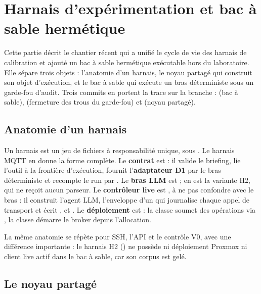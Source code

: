 \section{Harnais d'expérimentation et bac à sable hermétique}\label{sec:harnais-sandbox}

Cette partie décrit le chantier récent qui a unifié le cycle de vie des harnais
de calibration et ajouté un bac à sable hermétique exécutable hors du
laboratoire. Elle sépare trois objets : l'anatomie d'un harnais, le noyau
partagé qui construit son objet d'exécution, et le bac à sable qui exécute un
bras déterministe sous un garde-fou d'audit. Trois commits en portent la trace
sur la branche  :  (bac à sable), 
(fermeture des trous du garde-fou) et  (noyau partagé).

\subsection{Anatomie d'un harnais}

Un harnais est un jeu de fichiers à responsabilité unique, sous
. Le harnais MQTT en donne la forme complète. Le
\textbf{contrat} est  : il valide le briefing, lie
l'outil à la frontière d'exécution, fournit l'\textbf{adaptateur D1} par le bras
déterministe  et recompte le run par . Le
\textbf{bras LLM} est  ;
 en est la variante H2, qui ne reçoit aucun parseur.
Le \textbf{contrôleur live} est , à ne pas
confondre avec le bras : il construit l'agent LLM, l'enveloppe d'un
 qui journalise chaque appel de transport et écrit
,  et . Le
\textbf{déploiement} est  : la classe
 soumet des opérations via , la classe
 démarre le broker depuis l'allocation.

La même anatomie se répète pour SSH, l'API et le contrôle V0, avec une
différence importante : le harnais H2 () ne possède ni
déploiement Proxmox ni client live actif dans le bac à sable, car son corpus est
gelé.

\subsection{Le noyau partagé}

